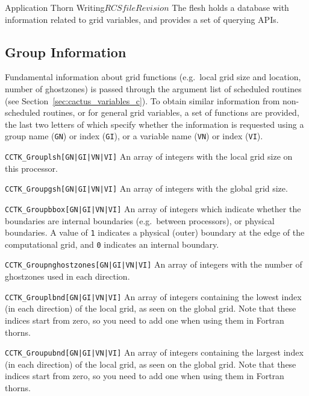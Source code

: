 \begin{cactuspart}{Application Thorn Writing}{$RCSfile$}{$Revision$}
The flesh holds a database with information related to grid variables, and
provides a set of querying APIs.

\subsection{Group Information}

Fundamental information about grid functions (e.g.\ local grid size and
location, number of ghostzones) is passed through the argument list of
scheduled routines (see Section~\ref{sec:cactus_variables_c}). To obtain similar information
from non-scheduled routines, or for general grid variables, a set of
functions are provided, the last two letters of which specify whether
the information is requested using a group name (\texttt{GN}) or index
(\texttt{GI}), or a variable name (\texttt{VN}) or index (\texttt{VI}).

\begin{Lentry}

\item [\texttt{CCTK\_Grouplsh[GN|GI|VN|VI]}]    An array of integers
      with the local grid size on this processor.

\item [\texttt{CCTK\_Groupgsh[GN|GI|VN|VI]}]    An array of integers
      with the global grid size.

\item [\texttt{CCTK\_Groupbbox[GN|GI|VN|VI]}]      An array of  integers
      which indicate whether the boundaries are internal boundaries
      (e.g.\ between processors), or physical boundaries.
        A value of \texttt{1} indicates
      a physical (outer) boundary at the edge of the computational grid,
      and \texttt{0} indicates an internal boundary.

\item [\texttt{CCTK\_Groupnghostzones[GN|GI|VN|VI]}]    An array of integers with
         the number of ghostzones used in each direction.

\item [\texttt{CCTK\_Grouplbnd[GN|GI|VN|VI]}]       An array of integers
      containing the lowest index (in each direction)
      of the local grid, as seen on the global grid. Note that these indices
      start from zero, so you need to add one when using them in
      Fortran thorns.

\item [\texttt{CCTK\_Groupubnd[GN|GI|VN|VI]}]       An array of integers
      containing the largest index (in each direction)
      of the local grid, as seen on the global grid. Note that these indices
      start from zero, so you need to add one when using them in
      Fortran thorns.


\end{Lentry}
\end{cactuspart}
